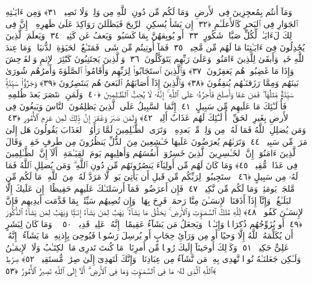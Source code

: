  وَمَآ أَنتُم بِمُعجِزِينَ فِى ٱلأَرضِ ۖ وَمَا لَكُم مِّن دُونِ ٱللَّهِ مِن وَلِىٍّۢ وَلَا نَصِيرٍۢ ﴿٣١﴾
 وَمِن ءَايَـٰتِهِ ٱلجَوَارِ فِى ٱلبَحرِ كَٱلأَعلَـٰمِ ﴿٣٢﴾
 إِن يَشَأ يُسكِنِ ٱلرِّيحَ فَيَظلَلنَ رَوَاكِدَ عَلَىٰ ظَهرِهِۦٓ ۚ إِنَّ فِى ذَٟلِكَ لَءَايَـٰتٍۢ لِّكُلِّ صَبَّارٍۢ شَكُورٍ ﴿٣٣﴾
 أَو يُوبِقهُنَّ بِمَا كَسَبُوا۟ وَيَعفُ عَن كَثِيرٍۢ ﴿٣٤﴾
 وَيَعلَمَ ٱلَّذِينَ يُجَٰدِلُونَ فِىٓ ءَايَـٰتِنَا مَا لَهُم مِّن مَّحِيصٍۢ ﴿٣٥﴾
 فَمَآ أُوتِيتُم مِّن شَىءٍۢ فَمَتَـٰعُ ٱلحَيَوٰةِ ٱلدُّنيَا ۖ وَمَا عِندَ ٱللَّهِ خَيرٌۭ وَأَبقَىٰ لِلَّذِينَ ءَامَنُوا۟ وَعَلَىٰ رَبِّهِم يَتَوَكَّلُونَ ﴿٣٦﴾
 وَٱلَّذِينَ يَجتَنِبُونَ كَبَٰٓئِرَ ٱلإِثمِ وَٱلفَوَٟحِشَ وَإِذَا مَا غَضِبُوا۟ هُم يَغفِرُونَ ﴿٣٧﴾
 وَٱلَّذِينَ ٱستَجَابُوا۟ لِرَبِّهِم وَأَقَامُوا۟ ٱلصَّلَوٰةَ وَأَمرُهُم شُورَىٰ بَينَهُم وَمِمَّا رَزَقنَـٰهُم يُنفِقُونَ ﴿٣٨﴾
 وَٱلَّذِينَ إِذَآ أَصَابَهُمُ ٱلبَغىُ هُم يَنتَصِرُونَ ﴿٣٩﴾
 وَجَزَٰٓؤُا۟ سَيِّئَةٍۢ سَيِّئَةٌۭ مِّثلُهَا ۖ فَمَن عَفَا وَأَصلَحَ فَأَجرُهُۥ عَلَى ٱللَّهِ ۚ إِنَّهُۥ لَا يُحِبُّ ٱلظَّـٰلِمِينَ ﴿٤٠﴾
 وَلَمَنِ ٱنتَصَرَ بَعدَ ظُلمِهِۦ فَأُو۟لَـٰٓئِكَ مَا عَلَيهِم مِّن سَبِيلٍ ﴿٤١﴾
 إِنَّمَا ٱلسَّبِيلُ عَلَى ٱلَّذِينَ يَظلِمُونَ ٱلنَّاسَ وَيَبغُونَ فِى ٱلأَرضِ بِغَيرِ ٱلحَقِّ ۚ أُو۟لَـٰٓئِكَ لَهُم عَذَابٌ أَلِيمٌۭ ﴿٤٢﴾
 وَلَمَن صَبَرَ وَغَفَرَ إِنَّ ذَٟلِكَ لَمِن عَزمِ ٱلأُمُورِ ﴿٤٣﴾
 وَمَن يُضلِلِ ٱللَّهُ فَمَا لَهُۥ مِن وَلِىٍّۢ مِّنۢ بَعدِهِۦ ۗ وَتَرَى ٱلظَّـٰلِمِينَ لَمَّا رَأَوُا۟ ٱلعَذَابَ يَقُولُونَ هَل إِلَىٰ مَرَدٍّۢ مِّن سَبِيلٍۢ ﴿٤٤﴾
 وَتَرَىٰهُم يُعرَضُونَ عَلَيهَا خَـٰشِعِينَ مِنَ ٱلذُّلِّ يَنظُرُونَ مِن طَرفٍ خَفِىٍّۢ ۗ وَقَالَ ٱلَّذِينَ ءَامَنُوٓا۟ إِنَّ ٱلخَـٰسِرِينَ ٱلَّذِينَ خَسِرُوٓا۟ أَنفُسَهُم وَأَهلِيهِم يَومَ ٱلقِيَـٰمَةِ ۗ أَلَآ إِنَّ ٱلظَّـٰلِمِينَ فِى عَذَابٍۢ مُّقِيمٍۢ ﴿٤٥﴾
 وَمَا كَانَ لَهُم مِّن أَولِيَآءَ يَنصُرُونَهُم مِّن دُونِ ٱللَّهِ ۗ وَمَن يُضلِلِ ٱللَّهُ فَمَا لَهُۥ مِن سَبِيلٍ ﴿٤٦﴾
 ٱستَجِيبُوا۟ لِرَبِّكُم مِّن قَبلِ أَن يَأتِىَ يَومٌۭ لَّا مَرَدَّ لَهُۥ مِنَ ٱللَّهِ ۚ مَا لَكُم مِّن مَّلجَإٍۢ يَومَئِذٍۢ وَمَا لَكُم مِّن نَّكِيرٍۢ ﴿٤٧﴾
 فَإِن أَعرَضُوا۟ فَمَآ أَرسَلنَـٰكَ عَلَيهِم حَفِيظًا ۖ إِن عَلَيكَ إِلَّا ٱلبَلَـٰغُ ۗ وَإِنَّآ إِذَآ أَذَقنَا ٱلإِنسَـٰنَ مِنَّا رَحمَةًۭ فَرِحَ بِهَا ۖ وَإِن تُصِبهُم سَيِّئَةٌۢ بِمَا قَدَّمَت أَيدِيهِم فَإِنَّ ٱلإِنسَـٰنَ كَفُورٌۭ ﴿٤٨﴾
 لِّلَّهِ مُلكُ ٱلسَّمَـٰوَٟتِ وَٱلأَرضِ ۚ يَخلُقُ مَا يَشَآءُ ۚ يَهَبُ لِمَن يَشَآءُ إِنَـٰثًۭا وَيَهَبُ لِمَن يَشَآءُ ٱلذُّكُورَ ﴿٤٩﴾
 أَو يُزَوِّجُهُم ذُكرَانًۭا وَإِنَـٰثًۭا ۖ وَيَجعَلُ مَن يَشَآءُ عَقِيمًا ۚ إِنَّهُۥ عَلِيمٌۭ قَدِيرٌۭ ﴿٥٠﴾
 ۞ وَمَا كَانَ لِبَشَرٍ أَن يُكَلِّمَهُ ٱللَّهُ إِلَّا وَحيًا أَو مِن وَرَآئِ حِجَابٍ أَو يُرسِلَ رَسُولًۭا فَيُوحِىَ بِإِذنِهِۦ مَا يَشَآءُ ۚ إِنَّهُۥ عَلِىٌّ حَكِيمٌۭ ﴿٥١﴾
 وَكَذَٟلِكَ أَوحَينَآ إِلَيكَ رُوحًۭا مِّن أَمرِنَا ۚ مَا كُنتَ تَدرِى مَا ٱلكِتَـٰبُ وَلَا ٱلإِيمَـٰنُ وَلَـٰكِن جَعَلنَـٰهُ نُورًۭا نَّهدِى بِهِۦ مَن نَّشَآءُ مِن عِبَادِنَا ۚ وَإِنَّكَ لَتَهدِىٓ إِلَىٰ صِرَٰطٍۢ مُّستَقِيمٍۢ ﴿٥٢﴾
 صِرَٰطِ ٱللَّهِ ٱلَّذِى لَهُۥ مَا فِى ٱلسَّمَـٰوَٟتِ وَمَا فِى ٱلأَرضِ ۗ أَلَآ إِلَى ٱللَّهِ تَصِيرُ ٱلأُمُورُ ﴿٥٣﴾
 
